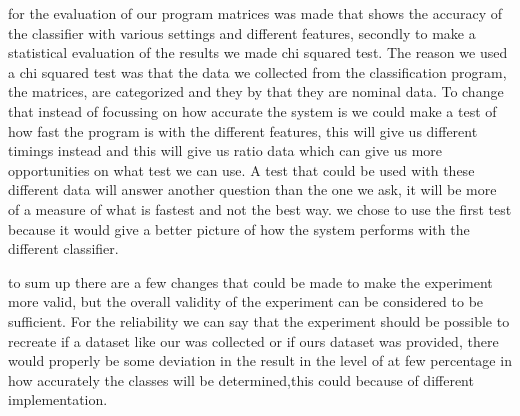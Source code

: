 
for the evaluation of our program matrices was made that shows the accuracy of the classifier with various settings and different features, secondly to make a statistical evaluation of the results we made chi squared test. The reason we used a chi squared test was that the data we collected from the classification program, the matrices, are categorized and they by that they are nominal data. To change that instead of focussing on how accurate the system is we could make a test of how fast the program is with the different features, this will give us different timings instead and this will give us ratio data which can give us more opportunities on what test we can use. A test that could be used with these different data will answer another question than the one we ask, it will be more of a measure of what is fastest and not the best way. we chose to use the first test because it would give a better picture of how the system performs with the different classifier.


to sum up there are a few changes that could be made to make the experiment more valid, but the overall validity of the experiment can be considered to be sufficient. For the reliability we can say that the experiment should be possible to recreate if a dataset like our was collected or if ours dataset was provided, there would properly be some deviation in the result in the level of at few percentage in how accurately the classes will be determined,this could because of different implementation.
